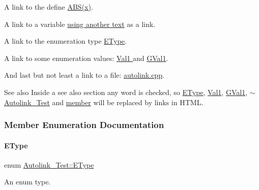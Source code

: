 A link to the define \hyperlink{autolink_8cpp_a996f7be338ccb40d1a2a5abc1ad61759}{A\+B\+S(x)}.

A link to a variable \hyperlink{class_autolink___test_a8de85603114bc9b9e53bd40764e9b499}{using another text} as a link.

A link to the enumeration type \hyperlink{class_autolink___test_aeb611627c332d067bded1806b1bb45c2}{E\+Type}.

A link to some enumeration values\+: \hyperlink{class_autolink___test_aeb611627c332d067bded1806b1bb45c2af70631e295bce280e74762d18af47a94}{Val1 } and \hyperlink{autolink_8cpp_a656d63cf384d2a6f23c2c18523a7bc5ea0f016f49e4f3bcd072319b9d68bc927d}{G\+Val1}.

And last but not least a link to a file\+: \hyperlink{autolink_8cpp}{autolink.\+cpp}.

\begin{DoxySeeAlso}{See also}
Inside a see also section any word is checked, so \hyperlink{class_autolink___test_aeb611627c332d067bded1806b1bb45c2}{E\+Type}, \hyperlink{class_autolink___test_aeb611627c332d067bded1806b1bb45c2af70631e295bce280e74762d18af47a94}{Val1}, \hyperlink{autolink_8cpp_a656d63cf384d2a6f23c2c18523a7bc5ea0f016f49e4f3bcd072319b9d68bc927d}{G\+Val1}, \hyperlink{class_autolink___test_a03bf46c8e2b733680035f524fd7b193b}{$\sim$\+Autolink\+\_\+\+Test} and \hyperlink{class_autolink___test_a393ea281f235a2f603d98daf72b0d411}{member} will be replaced by links in H\+T\+ML. 
\end{DoxySeeAlso}


\subsubsection{Member Enumeration Documentation}
\mbox{\label{class_autolink___test_aeb611627c332d067bded1806b1bb45c2}} 
\paragraph{\texorpdfstring{E\+Type}{EType}}
{\footnotesize\ttfamily enum \hyperlink{class_autolink___test_aeb611627c332d067bded1806b1bb45c2}{Autolink\+\_\+\+Test\+::\+E\+Type}}



An enum type. 

